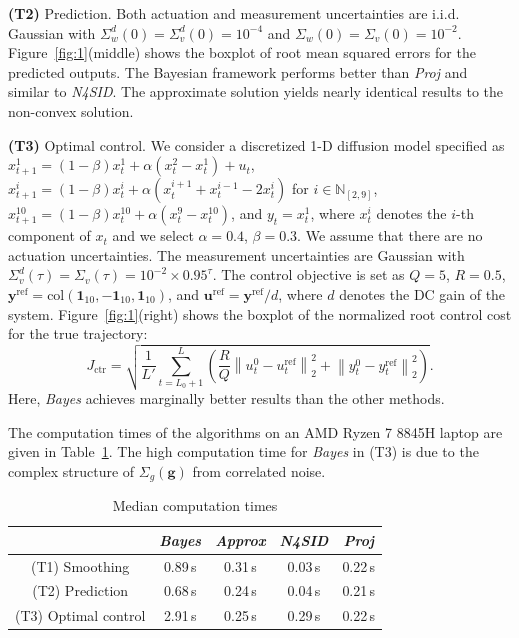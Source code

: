 \documentclass{ifacconf}
\newcommand{\norm}[1]{\left\lVert#1\right\rVert}
\newcommand{\col}[1]{\mathrm{col}\left(#1\right)}
\begin{document}
\textbf{(T2)} Prediction. Both actuation and measurement uncertainties are i.i.d. Gaussian with $\Sigma_w^d(0)=\Sigma_v^d(0)=10^{-4}$ and $\Sigma_w(0)=\Sigma_v(0)=10^{-2}$. Figure~\ref{fig:1}(middle) shows the boxplot of root mean squared errors for the predicted outputs. The Bayesian framework performs better than \textit{Proj} and similar to \textit{N4SID}. The approximate solution yields nearly identical results to the non-convex solution.

\textbf{(T3)} Optimal control. We consider a discretized 1-D diffusion model specified as $x_{t+1}^1=(1-\beta)x_t^1+\alpha(x_t^2-x_t^1)+u_t$, $x_{t+1}^i=(1-\beta)x_t^i+\alpha(x_t^{i+1}+x_t^{i-1}-2x_t^i)$ for $i\in\mathbb{N}_{[2,9]}$, $x_{t+1}^{10}=(1-\beta)x_t^{10}+\alpha(x_t^9-x_t^{10})$, and $y_t = x_t^1$, where $x_t^i$ denotes the $i$-th component of $x_t$ and we select $\alpha=0.4$, $\beta=0.3$. We assume that there are no actuation uncertainties. The measurement uncertainties are Gaussian with $\Sigma_v^d(\tau)=\Sigma_v(\tau)=10^{-2}\times 0.95^\tau$. The control objective is set as $Q=5$, $R=0.5$, $\mathbf{y}^\mathrm{ref}=\col{\mathbf{1}_{10},-\mathbf{1}_{10},\mathbf{1}_{10}}$, and $\mathbf{u}^\mathrm{ref}=\mathbf{y}^\mathrm{ref}/d$, where $d$ denotes the DC gain of the system. Figure~\ref{fig:1}(right) shows the boxplot of the normalized root control cost for the true trajectory:
$$\textstyle J_\mathrm{ctr}=\sqrt{\frac{1}{L'}\sum_{t=L_0+1}^L\left(\frac{R}{Q}\norm{u_t^0-u_t^\mathrm{ref}}_2^2+\norm{y_t^0-y_t^\mathrm{ref}}_2^2\right)}.$$
Here, \textit{Bayes} achieves marginally better results than the other methods.

The computation times of the algorithms on an AMD Ryzen 7 8845H laptop are given in Table~\ref{tbl:1}. The high computation time for \textit{Bayes} in (T3) is due to the complex structure of $\Sigma_g(\mathbf{g})$ from correlated noise.
\begin{table}[ht]
    \renewcommand{\arraystretch}{1.1}
    \centering
    \caption{Median computation times}
    \vspace{-0.5em}
    \begin{tabular}{ccccc}
    \hline\hline
     & \textit{Bayes} & \textit{Approx} & \textit{N4SID} & \textit{Proj}\\\hline
    (T1) Smoothing & 0.89\,s & 0.31\,s & 0.03\,s & 0.22\,s \\
    (T2) Prediction & 0.68\,s & 0.24\,s & 0.04\,s & 0.21\,s \\
    (T3) Optimal control & 2.91\,s & 0.25\,s & 0.29\,s & 0.22\,s \\\hline\hline
    \end{tabular}
    \label{tbl:1}
\end{table}
\end{document}
